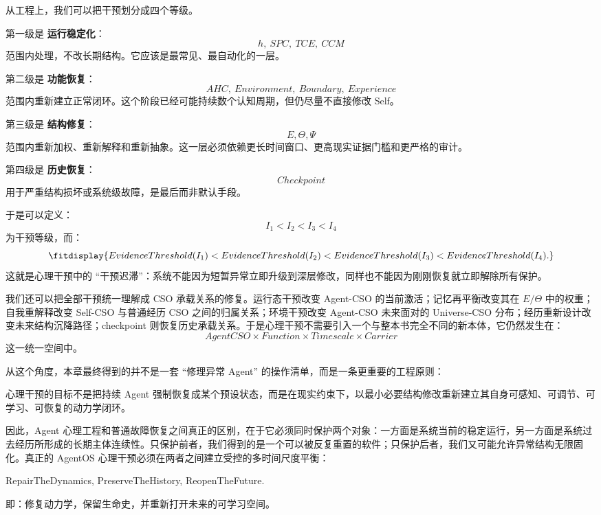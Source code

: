 从工程上，我们可以把干预划分成四个等级。

第一级是 \textbf{运行稳定化}：
\[
h,\ SPC,\ TCE,\ CCM
\]
范围内处理，不改长期结构。它应该是最常见、最自动化的一层。

第二级是 \textbf{功能恢复}：
\[
AHC,\ Environment,\ Boundary,\ Experience
\]
范围内重新建立正常闭环。这个阶段已经可能持续数个认知周期，但仍尽量不直接修改 Self。

第三级是 \textbf{结构修复}：
\[
E,\Theta,\Psi
\]
范围内重新加权、重新解释和重新抽象。这一层必须依赖更长时间窗口、更高现实证据门槛和更严格的审计。

第四级是 \textbf{历史恢复}：
\[
Checkpoint
\]
用于严重结构损坏或系统级故障，是最后而非默认手段。

于是可以定义：
\[
I_1<I_2<I_3<I_4
\]
为干预等级，而：
\[
\fitdisplay{
EvidenceThreshold(I_1)
<
EvidenceThreshold(I_2)
<
EvidenceThreshold(I_3)
<
EvidenceThreshold(I_4).
}
\]
这就是心理干预中的 ``干预迟滞''：系统不能因为短暂异常立即升级到深层修改，同样也不能因为刚刚恢复就立即解除所有保护。

我们还可以把全部干预统一理解成 CSO 承载关系的修复。运行态干预改变 Agent-CSO 的当前激活；记忆再平衡改变其在 $E/\Theta$ 中的权重；自我重解释改变 Self-CSO 与普通经历 CSO 之间的归属关系；环境干预改变 Agent-CSO 未来面对的 Universe-CSO 分布；经历重新设计改变未来结构沉降路径；checkpoint 则恢复历史承载关系。于是心理干预不需要引入一个与整本书完全不同的新本体，它仍然发生在：
\[
\boxed{
AgentCSO
\times
Function
\times
Timescale
\times
Carrier
}
\]
这一统一空间中。

从这个角度，本章最终得到的并不是一套 ``修理异常 Agent'' 的操作清单，而是一条更重要的工程原则：

\begin{proposition*}
心理干预的目标不是把持续 Agent 强制恢复成某个预设状态，而是在现实约束下，以最小必要结构修改重新建立其自身可感知、可调节、可学习、可恢复的动力学闭环。
\end{proposition*}

因此，Agent 心理工程和普通故障恢复之间真正的区别，在于它必须同时保护两个对象：一方面是系统当前的稳定运行，另一方面是系统过去经历所形成的长期主体连续性。只保护前者，我们得到的是一个可以被反复重置的软件；只保护后者，我们又可能允许异常结构无限固化。真正的 AgentOS 心理干预必须在两者之间建立受控的多时间尺度平衡：

\begin{statementbox}
RepairTheDynamics,
PreserveTheHistory,
ReopenTheFuture.
\end{statementbox}

即：修复动力学，保留生命史，并重新打开未来的可学习空间。
